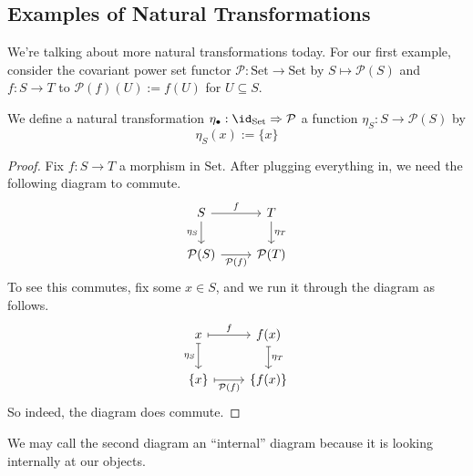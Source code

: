 
\subsection{Examples of Natural Transformations}
We're talking about more natural transformations today. For our first example, consider the covariant power set functor $\mathcal P:\mathrm{Set}\to\mathrm{Set}$ by $S\mapsto\mathcal P(S)$ and $f:S\to T$ to $\mathcal P(f)(U):=f(U)$ for $U\subseteq S$.
\begin{exe}
	 We define a natural transformation $\eta_\bullet:\id_{\mathrm{Set}}\Rightarrow\mathcal P$ a function $\eta_S:S\to\mathcal P(S)$ by
	\[\eta_S(x):=\{x\}\]
\end{exe}
\begin{proof}
	Fix $f:S\to T$ a morphism in $\mathrm{Set}$. After plugging everything in, we need the following diagram to commute.
	\[\begin{tikzcd}
		S & T \\
		{\mathcal P(S)} & {\mathcal P(T)}
		\arrow["{\mathcal P(f)}"', from=2-1, to=2-2]
		\arrow["{\eta_S}"', from=1-1, to=2-1]
		\arrow["{\eta_T}", from=1-2, to=2-2]
		\arrow["f", from=1-1, to=1-2]
	\end{tikzcd}\]
	To see this commutes, fix some $x\in S$, and we run it through the diagram as follows.
	\[\begin{tikzcd}
		x & {f(x)} \\
		{\{x\}} & {\{f(x)\}}
		\arrow["{\eta_S}"', maps to, from=1-1, to=2-1]
		\arrow["{\eta_T}", maps to, from=1-2, to=2-2]
		\arrow["f", maps to, from=1-1, to=1-2]
		\arrow["{\mathcal P(f)}"', maps to, from=2-1, to=2-2]
	\end{tikzcd}\]
	So indeed, the diagram does commute.
\end{proof}
\begin{remark}
	We may call the second diagram an ``internal'' diagram because it is looking internally at our objects.
\end{remark}
